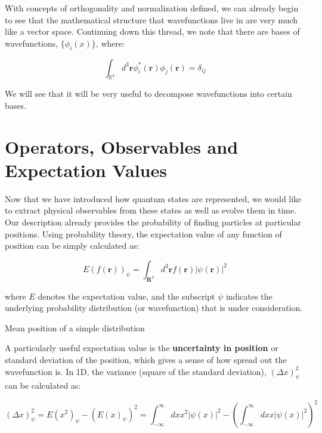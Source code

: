 With concepts of orthogonality and normalization defined, we can already begin to see that the mathematical structure that wavefunctions live in are very much like a vector space. Continuing down this thread, we note that there are bases of wavefunctions, $\{\phi_i(x)\}$, where:

\begin{equation}
	\int_{\mathbb{R}^3}d^3\mathbf{r}\phi_i^*(\mathbf{r})\phi_j(\mathbf{r}) = \delta_{ij}
\end{equation}

We will see that it will be very useful to decompose wavefunctions into certain bases. 

\section{Operators, Observables and Expectation Values}

Now that we have introduced how quantum states are represented, we would like to extract physical observables from these states as well as evolve them in time. Our description already provides the probability of finding particles at particular positions. Using probability theory, the expectation value of any function of position can be simply calculated as:

\begin{equation}
	E(f(\mathbf{r}))_{\psi} = \int_{\mathbf{R}^3} d^3\mathbf{r} f(\mathbf{r}) |\psi(\mathbf{r})|^2
\end{equation}

where $E$ denotes the expectation value, and the subscript $\psi$ indicates the underlying probability distribution (or wavefunction) that is under consideration. 

\begin{example}
	Mean position of a simple distribution
\end{example}

A particularly useful expectation value is the \textbf{uncertainty in position} or standard deviation of the position, which gives a sense of how spread out the wavefunction is. In 1D, the variance (square of the standard deviation), $(\Delta x)^2_{\psi} $ can be calculated as:

\begin{equation}
	(\Delta x)^2_{\psi} = E(x^2)_{\psi} - (E(x)_{\psi})^2 = \int_{-\infty}^{\infty} dx x^2 |\psi(x)|^2 - \left(\int_{-\infty}^{\infty} dx x |\psi(x)|^2 \right)^2
\end{equation}

